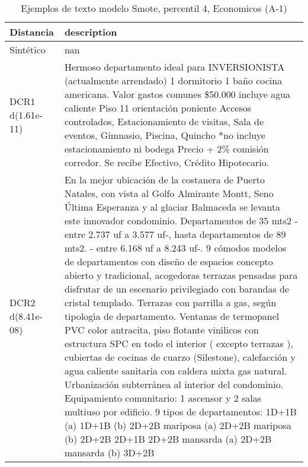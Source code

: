 \begin{table}[H]
\centering
\fontsize{10}{14}\selectfont
\caption{Ejemplos de texto modelo Smote, percentil 4, Economicos (A-1)}
\label{table-example-economicos-a-1-smote-enc-4p-text}
\begin{tabular}{|l|m{35em}|}
\hline
\rowcolor[gray]{0.8}
Distancia & description \\
\hline Sintético & nan \\
\hline DCR1 d(1.61e-11) & Hermoso departamento ideal para INVERSIONISTA (actualmente arrendado) 1 dormitorio 1 ba\~no cocina americana. Valor gastos comunes \$50.000 incluye agua caliente Piso 11 orientaci\'on poniente Accesos controlados, Estacionamiento de visitas, Sala de eventos, Gimnasio, Piscina, Quincho *no incluye estacionamiento ni bodega Precio + 2\% comisi\'on corredor.  Se recibe Efectivo, Cr\'edito Hipotecario. \\
\hline DCR2 d(8.41e-08) & En la mejor ubicaci\'on de la costanera de Puerto Natales, con vista al Golfo Almirante Montt, Seno \'Ultima Esperanza y al glaciar Balmaceda se levanta este innovador condominio. Departamentos de 35 mts2 - entre 2.737 uf a 3.577 uf-, hasta departamentos de 89 mts2. - entre 6.168 uf a 8.243 uf-. 9 c\'omodos modelos de departamentos con dise\~no de espacios concepto abierto y tradicional, acogedoras terrazas pensadas para disfrutar de un escenario privilegiado con barandas de cristal templado. Terrazas con parrilla a gas, seg\'un tipolog{\'\i}a de departamento. Ventanas de termopanel PVC color antracita, piso flotante vin{\'\i}licos con estructura SPC en todo el interior ( excepto terrazas ), cubiertas de cocinas de cuarzo (Silestone), calefacci\'on y agua caliente sanitaria con caldera mixta gas natural.  Urbanizaci\'on subterr\'anea al interior del condominio.   Equipamiento comunitario: 1 ascensor y 2 salas multiuso por edificio.  9 tipos de departamentos: 1D+1B (a) 1D+1B (b) 2D+2B mariposa (a) 2D+2B mariposa (b) 2D+2B 2D+1B 2D+2B mansarda (a) 2D+2B mansarda (b) 3D+2B \\
\hline
\end{tabular}
\end{table}

